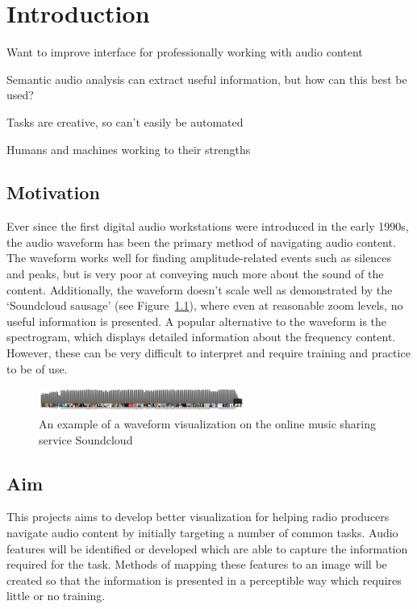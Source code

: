 \chapter{Introduction}\label{chpt:intro}

Want to improve interface for professionally working with audio content

Semantic audio analysis can extract useful information, but how can this best be used?

Tasks are creative, so can't easily be automated

Humans and machines working to their strengths

\section{Motivation}\label{sec:intro/motivation}
Ever since the first digital audio workstations were introduced in the early
1990s, the audio waveform has been the primary method of navigating audio
content. The waveform works well for finding amplitude-related events such as
silences and peaks, but is very poor at conveying much more about the sound of
the content. Additionally, the waveform doesn't scale well as demonstrated by
the `Soundcloud sausage' (see Figure~\ref{fig:soundcloud}), where even at
reasonable zoom levels, no useful information is presented.  A popular
alternative to the waveform is the spectrogram, which displays detailed
information about the frequency content. However, these can be very difficult
to interpret and require training and practice to be of use.

\begin{figure}[ht]
  \centering
  \includegraphics[width=0.6\textwidth]{figs/soundcloud.png}
  \caption{An example of a waveform visualization on the online music sharing
    service Soundcloud}
  \label{fig:soundcloud}
\end{figure}

\section{Aim}\label{sec:intro/aim}
This projects aims to develop better visualization for helping radio producers
navigate audio content by initially targeting a number of common tasks. Audio
features will be identified or developed which are able to capture the
information required for the task. Methods of mapping these features to an
image will be created so that the information is presented in a perceptible way
which requires little or no training. 

